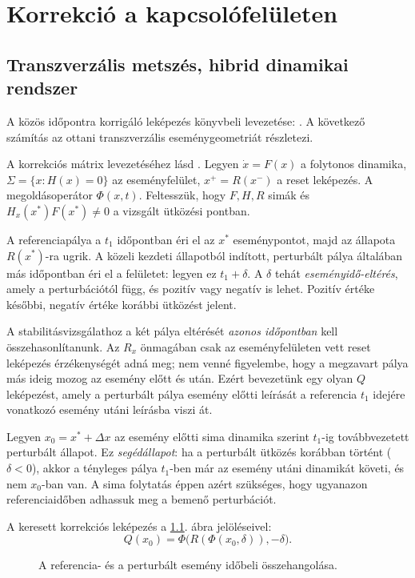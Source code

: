 \chapter{\label{sec:korr_kapcs}Korrekció a kapcsolófelületen}

\section{Transzverzális metszés, hibrid dinamikai rendszer}
A közös időpontra korrigáló leképezés könyvbeli levezetése: \cite[2.5.1--2.5.2. szakasz]{dib}. A következő számítás az ottani transzverzális eseménygeometriát részletezi.

A korrekciós mátrix levezetéséhez lásd \cite{kong}.
Legyen $\dot{x}=F(x)$ a folytonos dinamika, $\Sigma=\{x:H(x)=0\}$ az eseményfelület, $x^+=R(x^-)$ a reset leképezés. A megoldásoperátor $\Phi(x,t)$. Feltesszük, hogy $F,H,R$ simák és $H_x(x^*)F(x^*)\neq0$ a vizsgált ütközési pontban.

A referenciapálya a $t_1$ időpontban éri el az $x^*$ eseménypontot, majd az állapota $R(x^*)$-ra ugrik. A közeli kezdeti állapotból indított, perturbált pálya általában más időpontban éri el a felületet: legyen ez $t_1+\delta$. A $\delta$ tehát \emph{eseményidő-eltérés}, amely a perturbációtól függ, és pozitív vagy negatív is lehet. Pozitív értéke későbbi, negatív értéke korábbi ütközést jelent.

A stabilitásvizsgálathoz a két pálya eltérését \emph{azonos időpontban} kell összehasonlítanunk. Az $R_x$ önmagában csak az eseményfelületen vett reset leképezés érzékenységét adná meg; nem venné figyelembe, hogy a megzavart pálya más ideig mozog az esemény előtt és után. Ezért bevezetünk egy olyan $Q$ leképezést, amely a perturbált pálya esemény előtti leírását a referencia $t_1$ idejére vonatkozó esemény utáni leírásba viszi át.

Legyen $x_0=x^*+\Delta x$ az esemény előtti sima dinamika szerint $t_1$-ig továbbvezetett perturbált állapot. Ez \emph{segédállapot}: ha a perturbált ütközés korábban történt ($\delta<0$), akkor a tényleges pálya $t_1$-ben már az esemény utáni dinamikát követi, és nem $x_0$-ban van. A sima folytatás éppen azért szükséges, hogy ugyanazon referenciaidőben adhassuk meg a bemenő perturbációt.

A keresett korrekciós leképezés a \ref{fig:korr_idokorrekcio}. ábra jelöléseivel:
\begin{equation}\label{eq:Q_osszetetel}
Q(x_0)=\Phi\bigl(R(\Phi(x_0,\delta)),-\delta\bigr).
\end{equation}
\begin{figure}[htbp]\centering

\caption{A referencia- és a perturbált esemény időbeli összehangolása.}
\label{fig:korr_idokorrekcio}
\end{figure}

